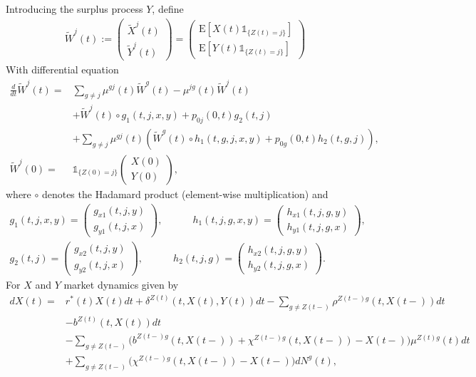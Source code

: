 \documentclass[12pt]{article}
\newcommand{\E}{\text{E}}
\newcommand{\indic}[1]{\mathds{1}_{ \{ #1 \} }}
\begin{document}
Introducing the surplus process $Y$, define
\begin{align*}
\tilde{W}^j(t):=
\begin{pmatrix}
\tilde{X}^j(t) \\
\tilde{Y}^j(t)
\end{pmatrix}
=
\begin{pmatrix}
\E[ X(t) \indic{Z(t)=j}] \\
\E[ Y(t) \indic{Z(t)=j}]
\end{pmatrix}
\end{align*}
With differential equation
\begin{align*}
\frac{d}{dt}\tilde{W}^j(t)=&
\sum_{g\neq j} \mu^{gj}(t) \tilde{W}^g(t) - \mu^{jg}(t) \tilde{W}^j(t)
\\
&+ \tilde{W}^j(t) \circ g_1(t,j,x,y)+p_{0j}(0,t) g_2(t,j)
\\
&+ \sum_{g \neq j} \mu^{gj}(t) \left( \tilde{W}^g(t) \circ h_1(t,g,j,x,y)+ p_{0g}(0,t) h_2(t,g,j) \right),
\\
\tilde{W}^j(0)=&\indic{Z(0)=j} \begin{pmatrix}
X(0)\\
Y(0)
\end{pmatrix},
\end{align*}
where $\circ$ denotes the Hadamard product (element-wise multiplication) and
\begin{gather*}
g_1(t,j,x,y)=\begin{pmatrix}
g_{x1}(t,j,y) \\
g_{y1}(t,j,x)
\end{pmatrix},
\qquad 
\quad
h_1(t,j,g,x,y)=\begin{pmatrix}
h_{x1}(t,j,g,y) \\
h_{y1}(t,j,g,x)
\end{pmatrix},
\\
g_2(t,j)=\begin{pmatrix}
g_{x2}(t,j,y) \\
g_{y2}(t,j,x)
\end{pmatrix},
\qquad 
\quad
h_2(t,j,g)=\begin{pmatrix}
h_{x2}(t,j,g,y) \\
h_{y2}(t,j,g,x)
\end{pmatrix}.
\end{gather*}
For $X$ and $Y$ market dynamics given by
\begin{align*}
dX(t)=&
r^*(t)X(t)dt
 +\delta^{Z(t)}(t,X(t),Y(t))  dt- \sum_{g \neq Z(t-)} \rho^{Z(t-)g}(t,X(t-)) dt
 \nonumber 
\\
\nonumber
&- b^{Z(t)}(t,X(t)) dt
\\
&- \sum_{g\neq Z(t-)}\bigg(b^{Z(t-)g}(t,X(t-))+\chi^{Z(t-)g}(t,X(t-))-X(t-) \bigg) \mu^{Z(t)g}(t)dt
\\
&+ \sum_{g\neq Z(t-)}\bigg(\chi^{Z(t-)g}(t,X(t-))-X(t-) \bigg)  dN^g(t),
\end{align*}
\end{document}
